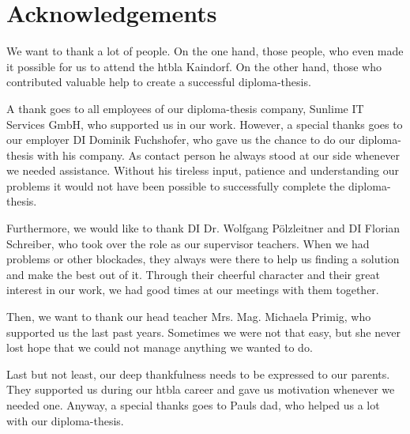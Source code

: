 \chapter*{Acknowledgements}
We want to thank a lot of people. On the one hand, those people, who even made it possible for us to attend the \gls{htbla} Kaindorf. On the other hand, those who contributed valuable help to create a successful diploma-thesis.

A thank goes to all employees of our diploma-thesis company, Sunlime IT Services GmbH, who supported us in our work. However, a special thanks goes to our employer DI Dominik Fuchshofer, who gave us the chance to do our diploma-thesis with his company. As contact person he always stood at our side whenever we needed assistance. Without his tireless input, patience and understanding our problems it would not have been possible to successfully complete the diploma-thesis.

Furthermore, we would like to thank DI Dr. Wolfgang Pölzleitner and DI Florian Schreiber, who took over the role as our supervisor teachers. When we had problems or other blockades, they always were there to help us finding a solution and make the best out of it. Through their cheerful character and their great interest in our work, we had good times at our meetings with them together.

Then, we want to thank our head teacher Mrs. Mag. Michaela Primig, who supported us the last past years. Sometimes we were not that easy, but she never lost hope that we could not manage anything we wanted to do.

Last but not least, our deep thankfulness needs to be expressed to our parents. They supported us during our \gls{htbla} career and gave us motivation whenever we needed one. Anyway, a special thanks goes to Pauls dad, who helped us a lot with our diploma-thesis.
\clearpageauthor

